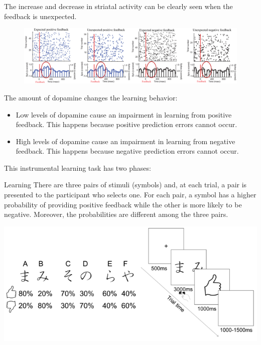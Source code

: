 \begin{description}
\begin{casestudy}
            The increase and decrease in striatal activity can be clearly seen when the feedback is unexpected.
            \begin{figure}[H]
                \centering
                \includegraphics[width=\linewidth]{./img/instrumental_dopamine_sn2.png}
            \end{figure}
        \end{casestudy}

    \item[Dopamine effect on behavior] 
        The amount of dopamine changes the learning behavior:
        \begin{itemize}
            \item Low levels of dopamine cause an impairment in learning from positive feedback.
                This happens because positive prediction errors cannot occur.
            
            \item High levels of dopamine cause an impairment in learning from negative feedback.
                This happens because negative prediction errors cannot occur.
        \end{itemize}

        \begin{casestudy}
            This instrumental learning task has two phases:
            \begin{descriptionlist}
                \item[Learning]
                    There are three pairs of stimuli (symbols) and, at each trial, a pair is presented to the participant who selects one.
                    For each pair, a symbol has a higher probability of providing positive feedback while the other is more likely to be negative.
                    Moreover, the probabilities are different among the three pairs.

                    \begin{center}
                        \includegraphics[width=0.55\linewidth]{./img/instrumental_dopamine_selection1.png}
                    \end{center}


\end{descriptionlist}
\end{casestudy}
\end{description}
